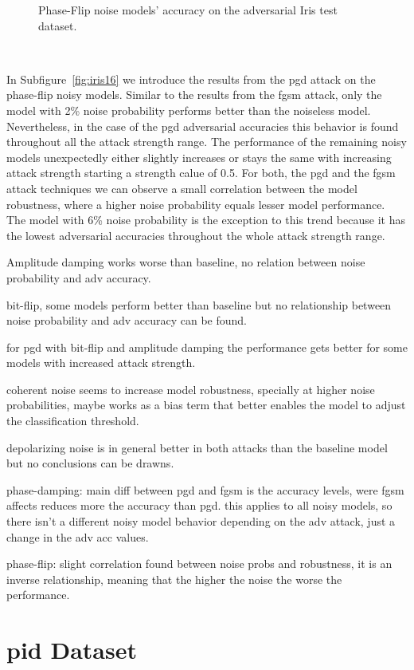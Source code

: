 \begin{figure}[!h]
  \caption{Phase-Flip noise models' accuracy on the adversarial Iris test dataset.}
  \label{fig:iris-1516}
\end{figure} \

In Subfigure~\ref{fig:iris16} we introduce the results from the \ac{pgd}
attack on the phase-flip noisy models. Similar to the results from the
\ac{fgsm} attack, only the model with 2\% noise probability performs
better than the noiseless model. Nevertheless, in the case of the \ac{pgd}
adversarial accuracies this behavior is found throughout all the attack
strength range. The performance of the remaining noisy models unexpectedly
either slightly increases or stays the same with increasing attack strength
starting a strength calue of 0.5. For both, the \ac{pgd} and the
\ac{fgsm} attack techniques we can observe a small correlation between the
model robustness, where a higher noise probability equals lesser model
performance. The model with 6\% noise probability is the exception to
this trend because it has the lowest adversarial accuracies throughout
the whole attack strength range. \

Amplitude damping works worse than baseline, no relation between noise
probability and adv accuracy. \

bit-flip, some models perform better than baseline but no relationship
between noise probability and adv accuracy can be found. \

for pgd with bit-flip and amplitude damping the performance gets better
for some models with increased attack strength. \

coherent noise seems to increase model robustness, specially at higher noise
probabilities, maybe works as a bias term that better enables the model
to adjust the classification threshold. \

depolarizing noise is in general better in both attacks than the baseline
model but no conclusions can be drawns. \

phase-damping: main diff between pgd and fgsm is the accuracy levels,
were fgsm affects reduces more the accuracy than pgd. this applies to
all noisy models, so there isn't a different noisy model behavior
depending on the adv attack, just a change in the adv acc values. \

phase-flip: slight correlation found between noise probs and robustness,
it is an inverse relationship, meaning that the higher the noise the worse
the performance.

\section{\acl{pid} Dataset}\label{section:diabetes-eval} \

